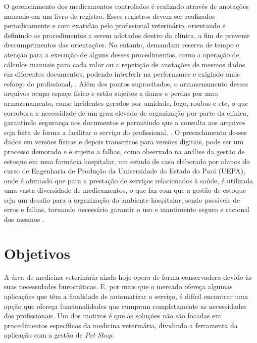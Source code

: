 \documentclass[
    12pt,               %
    openright,          %
    oneside,
    a4paper,            %
    BIBLATEX,           %
    TODO,               %
    english,            %
    brazil              %
    ]{ifsp-spo-inf-ctds}
\begin{document}
    O gerenciamento dos medicamentos controlados é realizado através de anotações manuais em um livro de registro. Esses registros devem ser realizados periodicamente e com exatidão pelo profissional veterinário, orientando e definindo os procedimentos a serem adotados dentro da clínica, a fim de prevenir descumprimentos das orientações. No entanto, demandam reserva de tempo e atenção para a execução de alguns desses procedimentos, como a operação de cálculos manuais para cada valor ou a repetição de anotações de mesmos dados em diferentes documentos, podendo interferir na performance e exigindo mais esforço do profissional, .
    Além dos pontos supracitados, o armazenamento desses arquivos ocupa espaço físico e estão sujeitos a danos e perdas por mau armazenamento, como incidentes gerados por umidade, fogo, roubos e etc, o que corrobora a necessidade de um grau elevado de organização por parte da clínica, garantindo segurança aos documentos e permitindo que a consulta aos arquivos seja feita de forma a facilitar o serviço do profissional, . O preenchimento desses dados em versões físicas e depois transcritos para versões digitais, pode ser um processo demorado e é sujeito a falhas, como observado na análise da gestão de estoque em uma farmácia hospitalar, um estudo de caso elaborado por alunos do curso de Engenharia de Produção da Universidade do Estado do Pará (UEPA), onde é afirmado que para a prestação de serviços relacionados à saúde, é utilizada uma vasta diversidade de medicamentos, o que faz com que a gestão de estoque seja um desafio para a organização do ambiente hospitalar, sendo passíveis de erros e falhas, tornando necessário garantir o uso e mantimento seguro e racional dos mesmos . 

    \section{Objetivos} \label{objetivos}

    A área de medicina veterinária ainda hoje opera de forma conservadora devido às suas necessidades burocráticas. E, por mais que o mercado ofereça algumas aplicações que têm a finalidade de automatizar o serviço, é difícil encontrar uma opção que ofereça funcionalidades que cumpram completamente as necessidades dos profissionais. Um dos motivos é que as soluções não são focadas em procedimentos específicos da medicina veterinária, dividindo a ferramenta da aplicação com a gestão de \emph{Pet Shop}.
    
\end{document}
